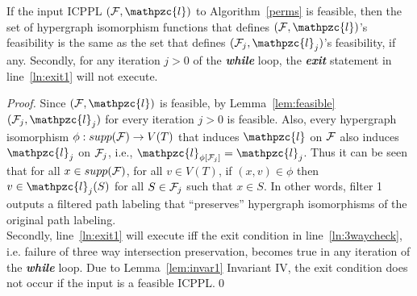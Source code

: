 \documentclass[11pt,
               envcountsect,
               envcountsame]
               {../lib/llncs2e/llncs}
\def\cF{{\cal F}}
\def\cl{\mathpzc{l}}
\begin{document}
\begin{lemma}
  \label{lem:noexit1}
  If the input ICPPL $(\cF, \cl)$ to Algorithm~\ref{perms} is
  feasible, then the set of hypergraph isomorphism functions that
  defines $(\cF, \cl)$'s feasibility is the same as the set that
  defines $(\cF_j, \cl_j)$'s feasibility, if any.  Secondly, for any
  iteration $j > 0$ of the {\em \bf while} loop, the {\em \bf exit}
  statement in line~\ref{ln:exit1} will not execute.
\end{lemma}
\begin{proof}
  Since $(\cF,\cl)$ is feasible, by Lemma~\ref{lem:feasible}
  $(\cF_j,\cl_j)$ for every iteration $j > 0$ is feasible.  %
  Also, every hypergraph isomorphism $\phi: supp(\cF) \rightarrow
  V(T)$ that induces $\cl$ on $\cF$ also induces $\cl_{j}$ on
  $\cF_{j}$, i.e., $\cl_{\phi[\cF_j]} = \cl_j$. Thus it can be seen
  that for all $x \in supp(\cF)$, for all $v \in V(T)$, if $(x,v) \in
  \phi$ then $v \in \cl_{j}(S)$ for all $S \in \cF_{j}$ such that $x
  \in S$.
  In other words, filter 1 outputs a filtered path labeling that
  ``preserves''
  hypergraph isomorphisms of the original path labeling.\\
  Secondly, line~\ref{ln:exit1} will execute iff the exit condition in
  line~\ref{ln:3waycheck}, i.e. failure of three way intersection
  preservation, becomes true in any iteration of the {\em \bf while}
  loop.  Due to Lemma~\ref{lem:invar1} Invariant IV, the exit
  condition does not occur if the input is a feasible ICPPL.\qed



\end{proof}
\end{document}
